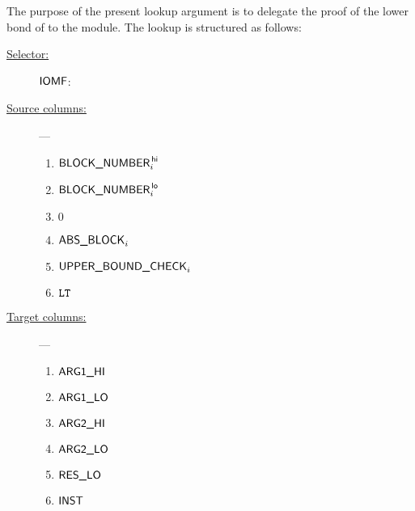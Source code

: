The purpose of the present lookup argument is to delegate the proof of the lower bond of \blockNumber{} to the \wcpMod{} module.
The lookup is structured as follows:
\begin{description}
	\item[\underline{Selector:}] $\textsf{IOMF}$:
	\item[\underline{Source columns:}] ---
		\begin{multicols}{3}
			\begin{enumerate}
				\item $\textsf{BLOCK\_NUMBER}^{\mathsf{\,hi}}_{i}$
				\item $\textsf{BLOCK\_NUMBER}^{\mathsf{\,lo}}_{i}$
				\item $0$
				\item $\textsf{ABS\_BLOCK}_{i}$
				\item $\textsf{UPPER\_BOUND\_CHECK}_{i}$
				\item $\texttt{LT}$
			\end{enumerate}
		\end{multicols}
	\item[\underline{Target columns:}] ---
		\begin{multicols}{3}
		\begin{enumerate}
			\item $\textsf{ARG}\textsf{1}\textsf{\_HI}$
			\item $\textsf{ARG}\textsf{1}\textsf{\_LO}$
			\item $\textsf{ARG}\textsf{2}\textsf{\_HI}$
			\item $\textsf{ARG}\textsf{2}\textsf{\_LO}$
			\item $\textsf{RES}\textsf{\_LO}$
			\item $\textsf{INST}$
		\end{enumerate}
		\end{multicols}
\end{description}
